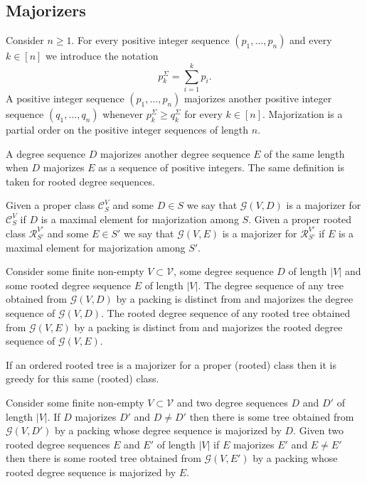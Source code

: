 \documentclass[11 pt]{modarticle}
\newcommand{\vset}{\mathcal{V}}
\newcommand{\size}[1]{|#1|}
\newcommand{\tclass}{\mathcal{C}}
\newcommand{\rtclass}{\mathcal{R}}
\newcommand{\greedy}[2]{\mathcal{G}(#1,#2)}
\newcommand{\pclass}[2]{\tclass^{#1}_{#2}}
\newcommand{\rpclass}[2]{\rtclass^{#1}_{#2}}
\begin{document}
\subsection{Majorizers}\label{section:majorization}

Consider $n \geq 1$. For every positive integer sequence $(p_1, \dots, p_n)$ and every $k \in [n]$ we introduce the notation
\begin{equation*}
	p^{\Sigma}_k = \underset{i=1}{\overset{k}{\sum}} p_i.
\end{equation*}
A positive integer sequence $(p_1, \dots, p_n)$ majorizes another positive integer sequence $(q_1, \dots, q_n)$ whenever $p^{\Sigma}_k \geq q^{\Sigma}_k$ for every $k \in [n]$. Majorization is a partial order on the positive integer sequences of length $n$. 

A degree sequence $D$ majorizes another degree sequence $E$ of the same length when $D$ majorizes $E$ as a sequence of positive integers. The same definition is taken for rooted degree sequences.

\begin{defi}
Given a proper class $\pclass{V}{S}$ and some $D \in S$ we say that $\greedy{V}{D}$ is a majorizer for $\pclass{V}{S}$ if $D$ is a maximal element for majorization among $S$. Given a proper rooted class $\rpclass{V'}{S'}$ and some $E \in S'$ we say that $\greedy{V}{E}$ is a majorizer for $\rpclass{V'}{S'}$ if $E$ is a maximal element for majorization among $S'$.
\end{defi}

\begin{rem}\label{rem:majorization}
Consider some finite non-empty $V \subset \vset$, some degree sequence $D$ of length $\size{V}$ and some rooted degree sequence $E$ of length $\size{V}$. The degree sequence of any tree obtained from $\greedy{V}{D}$ by a packing is distinct from and majorizes the degree sequence of $\greedy{V}{D}$. The rooted degree sequence of any rooted tree obtained from $\greedy{V}{E}$ by a packing is distinct from and majorizes the rooted degree sequence of $\greedy{V}{E}$. 
\end{rem}

\begin{cor}\label{cor:majorization}
If an ordered rooted tree is a majorizer for a proper (rooted) class then it is greedy for this same (rooted) class.
\end{cor}

\begin{prop}\label{prop:majorization}
Consider some finite non-empty $V \subset \vset$ and two degree sequences $D$ and $D'$ of length $\size{V}$. If $D$ majorizes $D'$ and $D \neq D'$ then there is some tree obtained from $\greedy{V}{D'}$ by a packing whose degree sequence is majorized by $D$. Given two rooted degree sequences $E$ and $E'$ of length $\size{V}$ if $E$ majorizes $E'$ and $E \neq E'$ then there is some rooted tree obtained from $\greedy{V}{E'}$ by a packing whose rooted degree sequence is majorized by $E$.
\end{prop}
\end{document}
